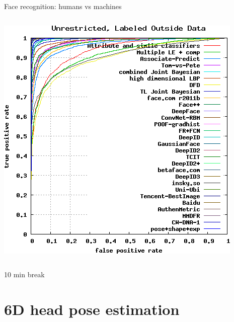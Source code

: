 \documentclass[compress]{beamer}
\makeatletter
\let\beamer@writeslidentry@miniframeson=\beamer@writeslidentry
\def\beamer@writeslidentry@miniframesoff{%
  \expandafter\beamer@ifempty\expandafter{\beamer@framestartpage}{}%
  {%
    \clearpage\beamer@notesactions%
  }
}
\newcommand*{\miniframeson}{\let\beamer@writeslidentry=\beamer@writeslidentry@miniframeson}
\newcommand*{\miniframesoff}{\let\beamer@writeslidentry=\beamer@writeslidentry@miniframesoff}
\makeatother
\begin{document}
\begin{frame}{Face recognition: humans vs machines}
\begin{columns}
\begin{column}{0.5\linewidth}
\begin{center}
                \includegraphics[width=\linewidth]{lfw_unrestricted_labeled}
            \end{center}
        \end{column}
    \end{columns}

\end{frame}

\miniframesoff
\begin{frame}[plain]
    \begin{center}
        \Large
        10 min break\\[2em]
    \end{center}
\end{frame}
\miniframeson


\section{6D head pose estimation}
\end{document}
